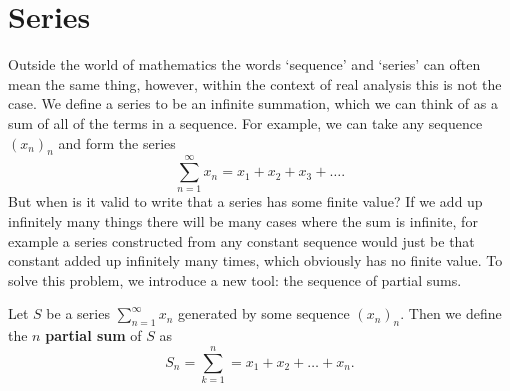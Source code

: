 \documentclass[../real_analysis.tex]{subfiles}
\begin{document}
    \section{Series}\label{sec:series}
        Outside the world of mathematics the words `sequence' and `series' can often mean the same thing, however, within the context of real analysis this is not the case. We define a series to be an infinite summation, which we can think of as a sum of all of the terms in a sequence. For example, we can take any sequence $(x_n)_n$ and form the series
        \begin{equation}
            \sum_{n=1}^\infty x_n=x_1+x_2+x_3+\dots.
        \end{equation}
        But when is it valid to write that a series has some finite value? If we add up infinitely many things there will be many cases where the sum is infinite, for example a series constructed from any constant sequence would just be that constant added up infinitely many times, which obviously has no finite value. To solve this problem, we introduce a new tool: the sequence of partial sums.
        \begin{definition}
            Let $S$ be a series $\sum_{n=1}^\infty x_n$ generated by some sequence $(x_n)_n$. Then we define the $n$ \textbf{partial sum} of $S$ as
            \begin{equation}
                S_n=\sum_{k=1}^n=x_1+x_2+\dots+x_n.
            \end{equation}
        \end{definition}
\end{document}
